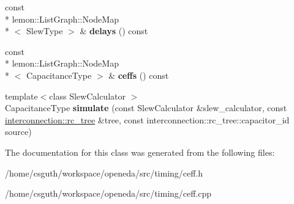\begin{DoxyCompactItemize}
\item 
\hypertarget{classophidian_1_1timing_1_1effective__capacitance__wire__model_a4376b848eaddca514112919fcb40b879}{const \\*
lemon\-::\-List\-Graph\-::\-Node\-Map\\*
$<$ Slew\-Type $>$ \& {\bfseries delays} () const }\label{classophidian_1_1timing_1_1effective__capacitance__wire__model_a4376b848eaddca514112919fcb40b879}

\item 
\hypertarget{classophidian_1_1timing_1_1effective__capacitance__wire__model_a7c5c700e08957253238cb8a1f9d55096}{const \\*
lemon\-::\-List\-Graph\-::\-Node\-Map\\*
$<$ Capacitance\-Type $>$ \& {\bfseries ceffs} () const }\label{classophidian_1_1timing_1_1effective__capacitance__wire__model_a7c5c700e08957253238cb8a1f9d55096}

\item 
\hypertarget{classophidian_1_1timing_1_1effective__capacitance__wire__model_a681989322ec4ca83203d766caaaf1c32}{{\footnotesize template$<$class Slew\-Calculator $>$ }\\Capacitance\-Type {\bfseries simulate} (const Slew\-Calculator \&slew\-\_\-calculator, const \hyperlink{classophidian_1_1interconnection_1_1rc__tree}{interconnection\-::rc\-\_\-tree} \&tree, const interconnection\-::rc\-\_\-tree\-::capacitor\-\_\-id source)}\label{classophidian_1_1timing_1_1effective__capacitance__wire__model_a681989322ec4ca83203d766caaaf1c32}

\end{DoxyCompactItemize}


The documentation for this class was generated from the following files\-:\begin{DoxyCompactItemize}
\item 
/home/csguth/workspace/openeda/src/timing/ceff.\-h\item 
/home/csguth/workspace/openeda/src/timing/ceff.\-cpp\end{DoxyCompactItemize}
